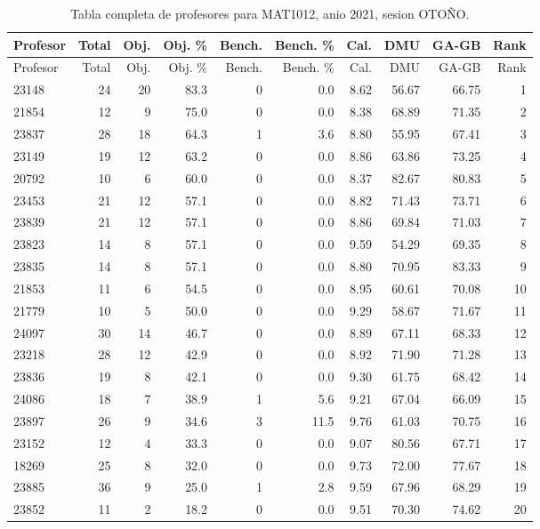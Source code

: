 \begingroup
\scriptsize
\setlength{\tabcolsep}{3pt}
\begin{longtable}{lrrrrrrrrr}
\caption{Tabla completa de profesores para MAT1012, anio 2021, sesion OTOÑO.}\label{tab:prof-period-mat1012-2021-oto-o-especializado}\\
\toprule
Profesor & Total & Obj. & Obj. \% & Bench. & Bench. \% & Cal. & DMU & GA-GB & Rank \\
\midrule
\endfirsthead
\toprule
Profesor & Total & Obj. & Obj. \% & Bench. & Bench. \% & Cal. & DMU & GA-GB & Rank \\
\midrule
\endhead
23148 & 24 & 20 & 83.3 & 0 & 0.0 & 8.62 & 56.67 & 66.75 & 1 \\
21854 & 12 & 9 & 75.0 & 0 & 0.0 & 8.38 & 68.89 & 71.35 & 2 \\
23837 & 28 & 18 & 64.3 & 1 & 3.6 & 8.80 & 55.95 & 67.41 & 3 \\
23149 & 19 & 12 & 63.2 & 0 & 0.0 & 8.86 & 63.86 & 73.25 & 4 \\
20792 & 10 & 6 & 60.0 & 0 & 0.0 & 8.37 & 82.67 & 80.83 & 5 \\
23453 & 21 & 12 & 57.1 & 0 & 0.0 & 8.82 & 71.43 & 73.71 & 6 \\
23839 & 21 & 12 & 57.1 & 0 & 0.0 & 8.86 & 69.84 & 71.03 & 7 \\
23823 & 14 & 8 & 57.1 & 0 & 0.0 & 9.59 & 54.29 & 69.35 & 8 \\
23835 & 14 & 8 & 57.1 & 0 & 0.0 & 8.80 & 70.95 & 83.33 & 9 \\
21853 & 11 & 6 & 54.5 & 0 & 0.0 & 8.95 & 60.61 & 70.08 & 10 \\
21779 & 10 & 5 & 50.0 & 0 & 0.0 & 9.29 & 58.67 & 71.67 & 11 \\
24097 & 30 & 14 & 46.7 & 0 & 0.0 & 8.89 & 67.11 & 68.33 & 12 \\
23218 & 28 & 12 & 42.9 & 0 & 0.0 & 8.92 & 71.90 & 71.28 & 13 \\
23836 & 19 & 8 & 42.1 & 0 & 0.0 & 9.30 & 61.75 & 68.42 & 14 \\
24086 & 18 & 7 & 38.9 & 1 & 5.6 & 9.21 & 67.04 & 66.09 & 15 \\
23897 & 26 & 9 & 34.6 & 3 & 11.5 & 9.76 & 61.03 & 70.75 & 16 \\
23152 & 12 & 4 & 33.3 & 0 & 0.0 & 9.07 & 80.56 & 67.71 & 17 \\
18269 & 25 & 8 & 32.0 & 0 & 0.0 & 9.73 & 72.00 & 77.67 & 18 \\
23885 & 36 & 9 & 25.0 & 1 & 2.8 & 9.59 & 67.96 & 68.29 & 19 \\
23852 & 11 & 2 & 18.2 & 0 & 0.0 & 9.51 & 70.30 & 74.62 & 20 \\

\end{longtable}
